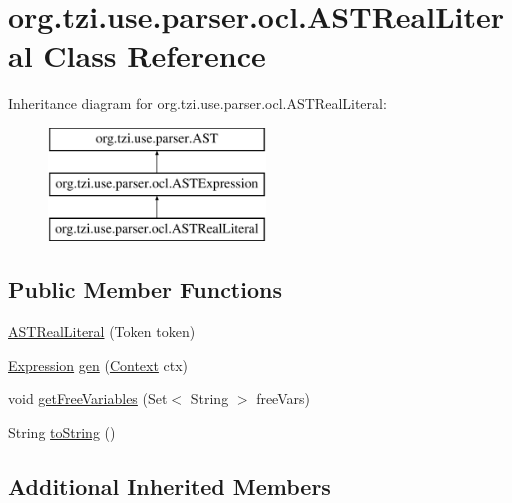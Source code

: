 \hypertarget{classorg_1_1tzi_1_1use_1_1parser_1_1ocl_1_1_a_s_t_real_literal}{\section{org.\-tzi.\-use.\-parser.\-ocl.\-A\-S\-T\-Real\-Literal Class Reference}
\label{classorg_1_1tzi_1_1use_1_1parser_1_1ocl_1_1_a_s_t_real_literal}
}
Inheritance diagram for org.\-tzi.\-use.\-parser.\-ocl.\-A\-S\-T\-Real\-Literal\-:\begin{figure}[H]
\begin{center}
\leavevmode
\includegraphics[height=3.000000cm]{classorg_1_1tzi_1_1use_1_1parser_1_1ocl_1_1_a_s_t_real_literal}
\end{center}
\end{figure}
\subsection*{Public Member Functions}
\begin{DoxyCompactItemize}
\item 
\hyperlink{classorg_1_1tzi_1_1use_1_1parser_1_1ocl_1_1_a_s_t_real_literal_acf1aee46fd4123756e41ec45ffd09968}{A\-S\-T\-Real\-Literal} (Token token)
\item 
\hyperlink{classorg_1_1tzi_1_1use_1_1uml_1_1ocl_1_1expr_1_1_expression}{Expression} \hyperlink{classorg_1_1tzi_1_1use_1_1parser_1_1ocl_1_1_a_s_t_real_literal_a4744bf95f5f7d94d64ac2a48b47ac6a9}{gen} (\hyperlink{classorg_1_1tzi_1_1use_1_1parser_1_1_context}{Context} ctx)
\item 
void \hyperlink{classorg_1_1tzi_1_1use_1_1parser_1_1ocl_1_1_a_s_t_real_literal_a33b7ff5698e360b033cfcf8671a7474c}{get\-Free\-Variables} (Set$<$ String $>$ free\-Vars)
\item 
String \hyperlink{classorg_1_1tzi_1_1use_1_1parser_1_1ocl_1_1_a_s_t_real_literal_af6cdfb3e566a74fec8271aac6ab14d92}{to\-String} ()
\end{DoxyCompactItemize}
\subsection*{Additional Inherited Members}


